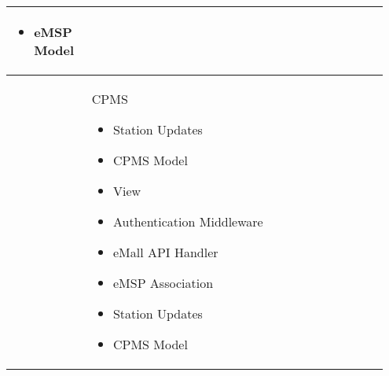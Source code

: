 {\begin{longtable}{|p{0.20\linewidth}p{0.75\linewidth}|}
\begin{itemize}
        \item eMSP Model
    \end{itemize} \\
    \hline
    \rowcolor{bluepoli!5}  & CPMS  \newline
    \begin{itemize}
        \item Station Updates
        \item CPMS Model
        \item View
        \item Authentication Middleware
        \item eMall API Handler
        \item eMSP Association
        \item Station Updates
        \item CPMS Model
    \end{itemize} \\
    \hline
\end{longtable}}
